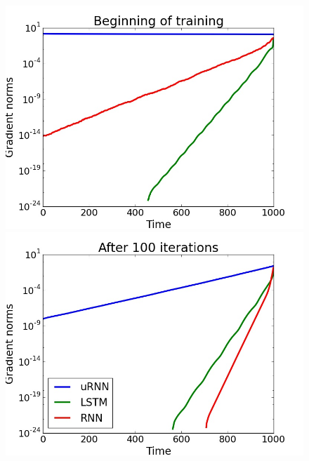 \documentclass{article} %
\begin{document}
\begin{figure}[t!] 
  \begin{minipage}[b]{0.25\linewidth}
    \centering
    \includegraphics[scale=0.125]{figures/grads_0.jpeg}
  \end{minipage}%
  \begin{minipage}[b]{0.25\linewidth}
    \centering
    \includegraphics[scale=0.125]{figures/grads_100.jpeg}
  \end{minipage}
  \begin{minipage}[b]{0.25\linewidth}
    \centering

\end{minipage}
\end{figure}
\end{document}
